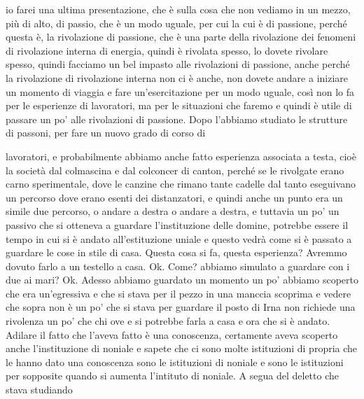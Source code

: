 io farei una ultima presentazione, che è sulla cosa che non vediamo in un mezzo, più di alto, di passio, che è un modo uguale, per cui la cui è di passione, perché questa è, la rivolazione di passione, che è una parte della rivolazione dei fenomeni di rivolazione interna di energia, quindi è rivolata spesso, lo dovete rivolare spesso, quindi facciamo un bel impasto alle rivolazioni di passione, anche perché la rivolazione di rivolazione interna non ci è anche, non dovete andare a iniziare un momento di viaggia e fare un'esercitazione per un modo uguale, così non lo fa per le esperienze di lavoratori, ma per le situazioni che faremo e quindi è utile di passare un po' alle rivolazioni di passione. Dopo l'abbiamo studiato le strutture di passoni, per fare un nuovo grado di corso di 

lavoratori, e probabilmente abbiamo anche fatto esperienza associata a testa, cioè la società dal colmascina e dal colconcer di canton, perché se le rivolgate erano carno sperimentale, dove le canzine che rimano tante cadelle dal tanto eseguivano un percorso dove erano esenti dei distanzatori, e quindi anche un punto era un simile due percorso, o andare a destra o andare a destra, e tuttavia un po' un passivo che si otteneva a guardare l'instituzione delle domine, potrebbe essere il tempo in cui si è andato all'estituzione uniale e questo vedrà come si è passato a guardare le cose in stile di casa. Questa cosa si fa, questa esperienza? Avremmo dovuto farlo a un testello a casa. Ok. Come? abbiamo simulato a guardare con i due ai mari? Ok. Adesso abbiamo guardato un momento un po' abbiamo scoperto che era un'egressiva e che si stava per il pezzo in una manccia scoprima e vedere che sopra non è un po' che si stava per guardare il posto di Irna non richiede una rivolenza un po' che chi ove e si potrebbe farla a casa e ora che si è andato. Adilare il fatto che l'aveva fatto è una conoscenza, certamente aveva scoperto anche l'instituzione di noniale e sapete che ci sono molte istituzioni di propria che le hanno dato una conoscenza sono le istituzioni di noniale e sono le istituzioni per sopposite quando si aumenta l'intituto di noniale. A segua del deletto che stava studiando 

